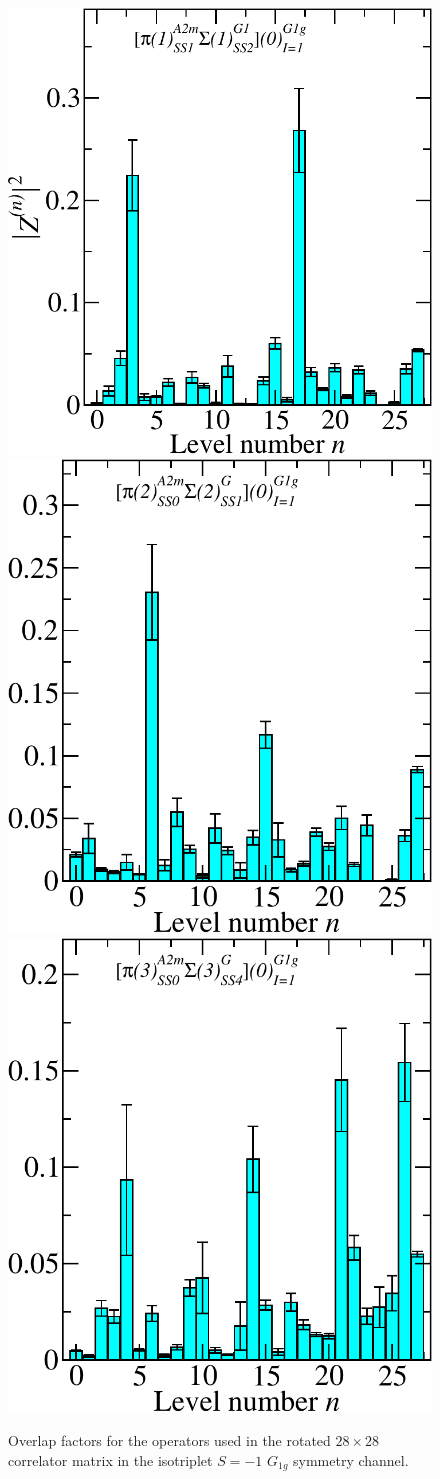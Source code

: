 \begin{figure}[H]
    \includegraphics[width=.1975\textwidth]{figures/sigmas/g1g/zfactors/zfactor_isotriplet_pion_sigma-G1g_1-P001-A2m-SS_1-P00-1-G1-SS_2.pdf}
    \hspace*{-0.06cm}\includegraphics[width=.185\textwidth]{figures/sigmas/g1g/zfactors/zfactor_isotriplet_pion_sigma-G1g_1-P011-A2m-SS_0-P0-1-1-G-SS_1.pdf}
    \hspace*{-0.06cm}\includegraphics[width=.185\textwidth]{figures/sigmas/g1g/zfactors/zfactor_isotriplet_pion_sigma-G1g_1-P111-A2m-SS_0-P-1-1-1-G-SS_4.pdf}
    \caption{Overlap factors for the operators used in the rotated $28\times 28$ correlator matrix in the isotriplet $S=-1$ $G_{1g}$ symmetry channel.}\label{fig:g1g_zfactors}
\end{figure}
\renewcommand{\arraystretch}{1.2}
